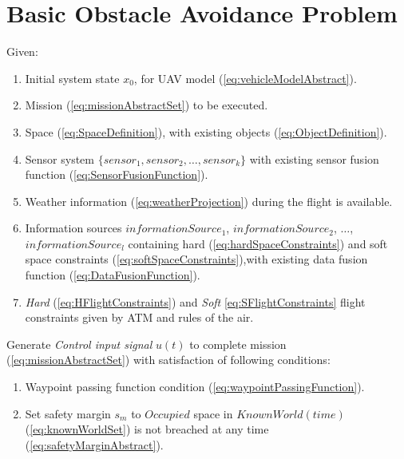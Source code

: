 \section{Basic Obstacle Avoidance Problem}\label{s:BasicProblemDefinition}
    \noindent Given:

    \begin{enumerate}
        \item Initial system state $x_0$, for UAV model (\ref{eq:vehicleModelAbstract}).
        
        \item Mission (\ref{eq:missionAbstractSet}) to be executed.
        
        \item Space (\ref{eq:SpaceDefinition}), with existing objects (\ref{eq:ObjectDefinition}).
        
        \item Sensor system $\{sensor_1, sensor_2,\dots,sensor_k\}$ with existing sensor fusion function (\ref{eq:SensorFusionFunction}).
        
        \item Weather information (\ref{eq:weatherProjection}) during the flight is available.
        
        \item Information sources $informationSource_1$, $informationSource_2$, $\dots$, $informationSource_l$ containing hard (\ref{eq:hardSpaceConstraints}) and soft space constraints (\ref{eq:softSpaceConstraints}),with existing data fusion function (\ref{eq:DataFusionFunction}).
        
        \item \emph{Hard} (\ref{eq:HFlightConstraints}) and \emph{Soft} \ref{eq:SFlightConstraints} flight constraints given by ATM and rules of the air. 
    \end{enumerate}

    \noindent Generate \emph{Control input signal} $u(t)$ to complete mission (\ref{eq:missionAbstractSet}) with satisfaction of following conditions:
    
    \begin{enumerate}
        \item Waypoint passing function condition (\ref{eq:waypointPassingFunction}).
        
        \item Set safety margin $s_m$ to $Occupied$  space in $KnownWorld(time)$ (\ref{eq:knownWorldSet}) is not breached at any time (\ref{eq:safetyMarginAbstract}).
    \end{enumerate}
